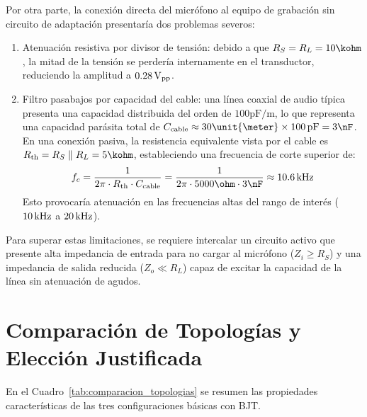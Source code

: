 Por otra parte, la conexión directa del micrófono al equipo de grabación sin circuito de adaptación presentaría
dos problemas severos:
\begin{enumerate}
  \item Atenuación resistiva por divisor de tensión: debido a que $R_S = R_L = 10\kohm$, la mitad de la tensión
    se perdería internamente en el transductor, reduciendo la amplitud a $0.28\,\mathrm{V}_{\mathrm{pp}}$.
  \item Filtro pasabajos por capacidad del cable: una línea coaxial de audio típica presenta una capacidad distribuida
    del orden de $100\unit{\pico\farad\per\meter}$, lo que representa una capacidad parásita total de
    $C_{\mathrm{cable}} \approx 30\unit{\meter} \times 100\pF = 3\nF$. En una conexión pasiva, la resistencia equivalente
    vista por el cable es $R_{\mathrm{th}} = R_S \parallel R_L = 5\kohm$, estableciendo una frecuencia de corte superior de:
    \begin{equation}
      f_c = \frac{1}{2\pi \cdot R_{\mathrm{th}} \cdot C_{\mathrm{cable}}} = \frac{1}{2\pi \cdot 5000\ohm \cdot 3\nF} \approx 10.6\kHz
    \end{equation}
    Esto provocaría atenuación en las frecuencias altas del rango de interés ($10\,\mathrm{kHz}$ a $20\,\mathrm{kHz}$).
\end{enumerate}

Para superar estas limitaciones, se requiere intercalar un circuito activo que presente alta impedancia de entrada
para no cargar al micrófono ($Z_i \ge R_S$) y una impedancia de salida reducida ($Z_o \ll R_L$) capaz de excitar la
capacidad de la línea sin atenuación de agudos.

\section{Comparación de Topologías y Elección Justificada}

En el Cuadro~\ref{tab:comparacion_topologias} se resumen las propiedades características de las tres configuraciones
básicas con BJT.

\begin{table}[!ht]
  \centering
  \caption{Comparativa técnica de las configuraciones con transistor bipolar de juntura.}
  \label{tab:comparacion_topologias}
\end{table}

